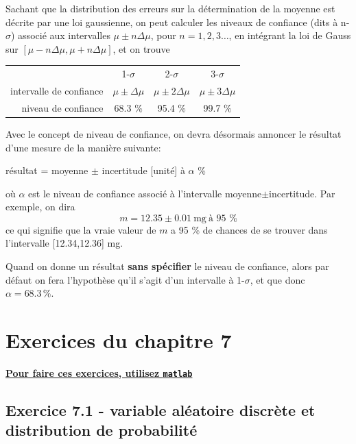 Sachant que la distribution des erreurs sur la détermination de la moyenne est décrite par une loi gaussienne, on peut calculer les niveaux de confiance (dits à n-$\sigma$) associé aux intervalles $\mu\pm n\Delta\mu$, pour $n=1,2,3\dots$, en intégrant la loi de Gauss sur $[\mu-n\Delta\mu,\mu+n\Delta\mu]$, et on trouve
\begin{center}
    \begin{tabular}{r|ccc}
                                & 1-$\sigma$        & 2-$\sigma$         & 3-$\sigma$         \\
        intervalle de confiance & $\mu\pm\Delta\mu$ & $\mu\pm2\Delta\mu$ & $\mu\pm3\Delta\mu$ \\
        niveau de confiance     & 68.3 \%           & 95.4 \%            & 99.7 \%
    \end{tabular}
\end{center}

Avec le concept de niveau de confiance, on devra désormais annoncer le résultat d'une mesure de la manière suivante:
\begin{center}
    résultat = moyenne $\pm$ incertitude [unité] à $\alpha$ \%
\end{center}
où $\alpha$ est le niveau de confiance associé à l'intervalle moyenne$\pm$incertitude. Par exemple, on dira
$$
    m=12.35\pm0.01\ \text{mg}\ \text{à 95 \%}
$$
ce qui signifie que la vraie valeur de $m$ a 95 \% de chances de se trouver dans l'intervalle [12.34,12.36] mg.

Quand on donne un résultat \textbf{sans spécifier} le niveau de confiance, alors par défaut on fera l'hypothèse qu'il s'agit d'un intervalle à 1-$\sigma$, et que donc $\alpha=68.3\,\%$.

\newpage

\section{Exercices du chapitre 7}

\begin{center}
    \Large \bf {\underline{Pour faire ces exercices, utilisez \texttt{matlab}}}
\end{center}

\subsection*{Exercice 7.1 - variable aléatoire discrète et distribution de probabilité}


